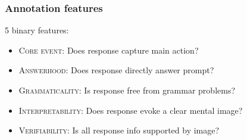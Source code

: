 \documentclass[xcolor={dvipsnames}]{beamer}
\newcommand{\feat}[1]{\textsc{#1}}
\begin{document}
\begin{frame}
\frametitle{Annotation features}
5 binary features:
\begin{itemize}
\pause
\vspace{.8em}
\item \feat{Core event}: \pause Does response capture main action?
\pause
\vspace{.8em}
\item \feat{Answerhood}: \pause Does response directly answer prompt?
\pause
\vspace{.8em}
\item \feat{Grammaticality}: \pause Is response free from grammar problems?
\pause
\vspace{.8em}
\item \feat{Interpretability}: \pause Does response evoke a clear mental image?
\pause
\vspace{.8em}
\item \feat{Verifiability}: \pause Is all response info supported by image?
\end{itemize}


\end{frame}
\end{document}
